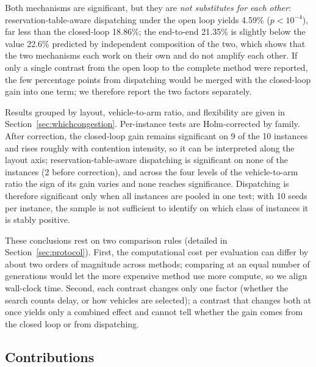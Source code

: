 \documentclass[manuscript,screen,review]{acmart}
\newcommand{\NCases}{10}
\newcommand{\NSeeds}{10}
\newcommand{\GainLoopRule}{18.86\%}      %
\newcommand{\GainProbeOpen}{4.59\%}      %
\newcommand{\PProbeOpen}{<10^{-4}}
\newcommand{\GainEndToEnd}{21.35\%}      %
\newcommand{\GainIndepProduct}{22.6\%}
\newcommand{\CellsSigLoopAdj}{9}
\newcommand{\CellsSigProbe}{2}
\begin{document}
Both mechanisms are significant, but they are \emph{not substitutes for each other}: reservation-table-aware dispatching under the open loop yields \GainProbeOpen{} ($p\PProbeOpen$), far less than the closed-loop \GainLoopRule{}; the end-to-end \GainEndToEnd{} is slightly below the value \GainIndepProduct{} predicted by independent composition of the two, which shows that the two mechanisms each work on their own and do not amplify each other.
If only a single contrast from the open loop to the complete method were reported, the few percentage points from dispatching would be merged with the closed-loop gain into one term; we therefore report the two factors separately.

Results grouped by layout, vehicle-to-arm ratio, and flexibility are given in Section~\ref{sec:whichcongestion}.
Per-instance tests are Holm-corrected by family.
After correction, the closed-loop gain remains significant on \CellsSigLoopAdj{} of the \NCases{} instances and rises roughly with contention intensity, so it can be interpreted along the layout axis; reservation-table-aware dispatching is significant on none of the instances (\CellsSigProbe{} before correction), and across the four levels of the vehicle-to-arm ratio the sign of its gain varies and none reaches significance.
Dispatching is therefore significant only when all instances are pooled in one test; with \NSeeds{} seeds per instance, the sample is not sufficient to identify on which class of instances it is stably positive.

These conclusions rest on two comparison rules (detailed in Section~\ref{sec:protocol}). First, the computational cost per evaluation can differ by about two orders of magnitude across methods; comparing at an equal number of generations would let the more expensive method use more compute, so we align wall-clock time.
Second, each contrast changes only one factor (whether the search counts delay, or how vehicles are selected); a contrast that changes both at once yields only a combined effect and cannot tell whether the gain comes from the closed loop or from dispatching.

\subsection{Contributions}
\end{document}
